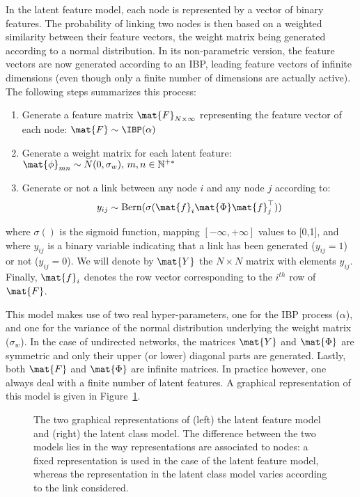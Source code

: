 In the latent feature model, each node is represented by a vector of binary features. The probability of linking two nodes is then based on a weighted similarity between their feature vectors, the weight matrix being generated according to a normal distribution. In its non-parametric version, the feature vectors are now generated according to an IBP, leading feature vectors of infinite dimensions (even though only a finite number of dimensions are actually active). The following steps summarizes this process:
%
\begin{enumerate}
\item Generate a feature matrix $\mat{F}_{N \times \infty}$ representing the feature vector of each node: $\mat{F} \sim \IBP(\alpha)$
\item Generate a weight matrix for each latent feature:\\
 $\mat{\phi}_{mn} \sim N(0, \sigma_w), \, m,n \in \mathbb{N}^{+*}$
\item Generate or not a link between any node $i$ and any node $j$ according to: 
%
\begin{equation}
y_{ij} \sim \mathrm{Bern}(\sigma(\mat{f}_{i} \mat{\Phi} \mat{f}_{j}^\top))
\label{eq:link-ilfm}
\end{equation}
\end{enumerate}
%
where $\sigma()$ is the sigmoid function, mapping $[-\infty, +\infty]$ values to [0,1], and where $y_{ij}$ is a binary variable indicating that a link has been generated ($y_{ij}=1$) or not ($y_{ij}=0$). We will denote by $\mat{Y}$ the $N \times N$ matrix with elements $y_{ij}$. Finally, $\mat{f}_{i}$ denotes the row vector corresponding to the $i^{th}$ row of $\mat{F}$.

This model makes use of two real hyper-parameters, one for the IBP process ($\alpha$), and one for the variance of the normal distribution underlying the weight matrix ($\sigma_w$). In the case of undirected networks, the matrices $\mat{Y}$ and $\mat{\Phi}$ are symmetric and only their upper (or lower) diagonal parts are generated. Lastly, both $\mat{F}$ and $\mat{\Phi}$ are infinite matrices. In practice however, one always deal with a finite number of latent features. A graphical representation of this model is given in Figure~\ref{fig:ilfrm}.

\begin{figure}[t]
	\centering
	\scalebox{0.88}{
	}
	\endminipage
	\scalebox{0.88}{
		}
	\endminipage
	\caption{The two graphical representations of (left) the latent feature model and (right) the latent class model. The difference between the two models lies in the way representations are associated to nodes: a fixed representation is used in the case of the latent feature model, whereas the representation in the latent class model varies according to the link considered.}
	\label{fig:ilfrm}
\end{figure}

